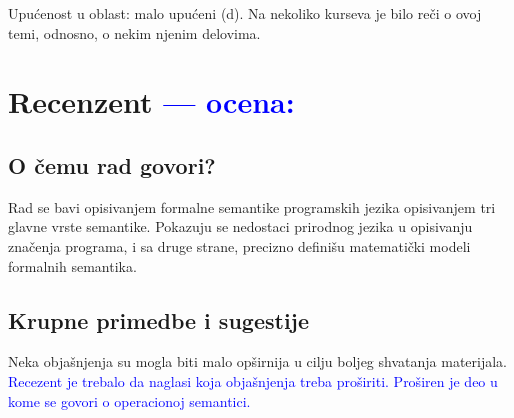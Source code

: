 \documentclass[a4paper]{report}
\newcommand{\odgovor}[1]{\textcolor{blue}{#1}}
\begin{document}
{Upućenost u oblast: malo upućeni (d). Na nekoliko kurseva je bilo reči o ovoj temi, odnosno, o nekim njenim delovima.}

\chapter{Recenzent \odgovor{--- ocena:}}

\section{O čemu rad govori?}
Rad se bavi opisivanjem formalne semantike programskih jezika opisivanjem tri glavne vrste semantike. Pokazuju se nedostaci prirodnog jezika u opisivanju značenja programa, i sa druge strane, precizno definišu matematički modeli formalnih semantika.

\section{Krupne primedbe i sugestije}
Neka objašnjenja su mogla biti malo opširnija u cilju  boljeg shvatanja materijala.
\odgovor{Recezent je trebalo da naglasi koja objašnjenja treba proširiti. Proširen je deo u kome se govori o operacionoj semantici.}
\end{document}
